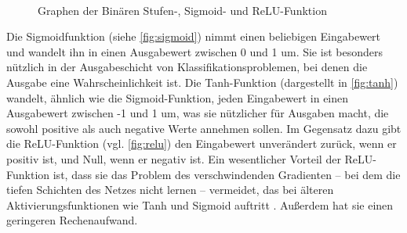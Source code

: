 \begin{figure}[h]
    \centering
    \\\;\;
    \caption{Graphen der Binären Stufen-, Sigmoid- und ReLU-Funktion}
    \label{fig:aktfunk}
\end{figure}
Die Sigmoidfunktion (siehe \ref{fig:sigmoid}) nimmt einen beliebigen Eingabewert und wandelt ihn in einen Ausgabewert zwischen 0 und 1 um. Sie ist besonders nützlich in der Ausgabeschicht von Klassifikationsproblemen, bei denen die Ausgabe eine Wahrscheinlichkeit ist.
Die Tanh-Funktion (dargestellt in \ref{fig:tanh}) wandelt, ähnlich wie die Sigmoid-Funktion, jeden Eingabewert in einen Ausgabewert zwischen -1 und 1 um, was sie nützlicher für Ausgaben macht, die sowohl positive als auch negative Werte annehmen sollen.
Im Gegensatz dazu gibt die ReLU-Funktion (vgl. \ref{fig:relu}) den Eingabewert unverändert zurück, wenn er positiv ist, und Null, wenn er negativ ist. Ein wesentlicher Vorteil der ReLU-Funktion ist, dass sie das Problem des verschwindenden Gradienten – bei dem die tiefen Schichten des Netzes nicht lernen – vermeidet, das bei älteren Aktivierungsfunktionen wie Tanh und Sigmoid auftritt \cite{atoum2023adaptive}. Außerdem hat sie einen geringeren Rechenaufwand.

